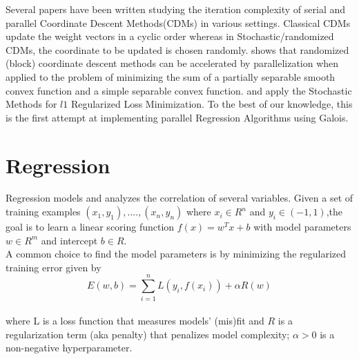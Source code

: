 \documentclass{sigplanconf}
\begin{document}
Several papers have been written studying the iteration complexity of serial and parallel Coordinate Descent Methods(CDMs) in various settings.
Classical CDMs update the weight vectors in a cyclic order whereas in Stochastic/randomized CDMs, the coordinate to be updated is chosen randomly.
\cite{pcd1} shows that randomized (block) coordinate descent methods can be accelerated by parallelization when applied to the problem 
of minimizing the sum of a partially separable smooth convex function and a simple separable convex function. 
\cite{tewari} and \cite{shotgun} apply the Stochastic Methods for \begin{math}l1 \end{math} Regularized Loss Minimization. 
To the best of our knowledge, this is the first attempt at implementing parallel Regression Algorithms using Galois.

\section{Regression}
\noindent
Regression models and analyzes the correlation of several variables. Given a set of training examples 
\begin{math}(x_1,y_1),....,(x_n,y_n)\end{math} where \begin{math} x_i \in R^n \end{math}
and \begin{math} y_i \in (-1,1) \end{math},the goal is to learn a linear scoring function
\begin{math} f(x) = w^Tx + b \end{math} with model parameters \begin{math} w \in R^m \end{math}
and intercept \begin{math} b \in R. \end{math}\\

\noindent
A common choice to find the model parameters is by minimizing the regularized training error given by\\
\begin{equation} E(w,b) = \sum_{i=1}^{n} L(y_i,f(x_i)) + \alpha R(w) \end{equation} \\
where L is a loss function that measures models' (mis)fit and \begin{math}R\end{math} is a
regularization term (aka penalty) that penalizes model complexity; \begin{math}\alpha>0\end{math}
is a non-negative hyperparameter.
\end{document}
